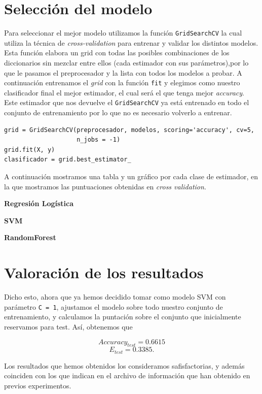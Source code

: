 \documentclass[size=a4, parskip=half, titlepage=false, toc=flat, toc=bib, 12pt]{scrartcl}
\begin{document}
\section{Selección del modelo}
Para seleccionar el mejor modelo utilizamos la función \verb|GridSearchCV| la cual utiliza la técnica de \textit{cross-validation} para entrenar y validar los distintos modelos. Esta función elabora un grid con todas las posibles combinaciones de los diccionarios sin mezclar entre ellos (cada estimador con sus parámetros),por lo que le pasamos el preprocesador y la lista con todos los modelos a probar. A continuación entrenamos el \textit{grid} con la función \verb|fit| y elegimos como nuestro clasificador final el mejor estimador, el cual será el que tenga mejor \textit{accuracy}. Este estimador que nos devuelve el \verb|GridSearchCV| ya está entrenado en todo el conjunto de entrenamiento por lo que no es necesario volverlo a entrenar.
\begin{verbatim}
grid = GridSearchCV(preprocesador, modelos, scoring='accuracy', cv=5,
                    n_jobs = -1)
grid.fit(X, y)
clasificador = grid.best_estimator_
\end{verbatim}

A continuación mostramos una tabla y un gráfico por cada clase de estimador, en la que mostramos las puntuaciones obtenidas en \textit{cross validation}.

\textbf{Regresión Logística}

\textbf{SVM}

\textbf{RandomForest}

\section{Valoración de los resultados}

Dicho esto, ahora que ya hemos decidido tomar como modelo SVM con parámetro \texttt{C = 1}, ajustamos el modelo sobre todo nuestro conjunto de entrenamiento, y calculamos la puntación sobre el conjunto que inicialmente reservamos para test. Así, obtenemos que

\[
Accuracy_{test} = 0.6615
\]
\[
E_{test} = 0.3385
.\]

Los resultados que hemos obtenidos los consideramos safisfactorias, y además coinciden con los que indican en el archivo de información que han obtenido en previos experimentos.

\end{document}
